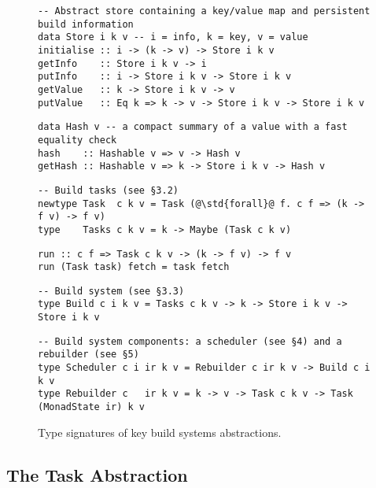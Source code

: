 \begin{figure}
\begin{verbatim}
-- Abstract store containing a key/value map and persistent build information
data Store i k v -- i = info, k = key, v = value
initialise :: i -> (k -> v) -> Store i k v
getInfo    :: Store i k v -> i
putInfo    :: i -> Store i k v -> Store i k v
getValue   :: k -> Store i k v -> v
putValue   :: Eq k => k -> v -> Store i k v -> Store i k v
\end{verbatim}
\begin{verbatim}
data Hash v -- a compact summary of a value with a fast equality check
hash    :: Hashable v => v -> Hash v
getHash :: Hashable v => k -> Store i k v -> Hash v
\end{verbatim}
\begin{verbatim}
-- Build tasks (see §3.2)
newtype Task  c k v = Task (@\std{forall}@ f. c f => (k -> f v) -> f v)
type    Tasks c k v = k -> Maybe (Task c k v)
\end{verbatim}
\begin{verbatim}
run :: c f => Task c k v -> (k -> f v) -> f v
run (Task task) fetch = task fetch
\end{verbatim}
\begin{verbatim}
-- Build system (see §3.3)
type Build c i k v = Tasks c k v -> k -> Store i k v -> Store i k v
\end{verbatim}
\begin{verbatim}
-- Build system components: a scheduler (see §4) and a rebuilder (see §5)
type Scheduler c i ir k v = Rebuilder c ir k v -> Build c i k v
type Rebuilder c   ir k v = k -> v -> Task c k v -> Task (MonadState ir) k v
\end{verbatim}
\caption{Type signatures of key build systems abstractions.}\label{fig-types}
\end{figure}

\subsection{The Task Abstraction}\label{sec-task}

